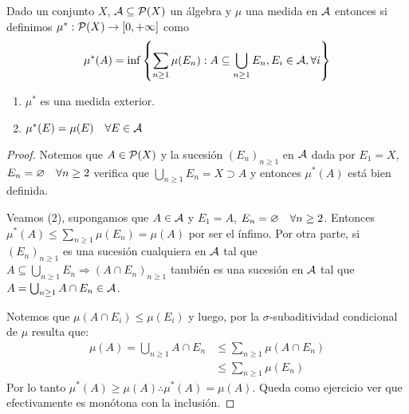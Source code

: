 \begin{theorem}
    Dado un conjunto $X$, $\mathcal{A} \subseteq \mathcal{P}(X)$ un álgebra y $\mu$ una medida en $\mathcal{A}$ entonces si definimos $\mu^*: \mathcal{P}(X) \to [0, +\infty]$ como \begin{align*}
        \mu^*(A) = \inf \left\{ \sum_{n \geq 1} \mu(E_n) : A \subseteq \bigcup_{n \geq 1} E_n, E_i \in \mathcal{A}, \forall i \right\}
    \end{align*}
    \begin{enumerate}
        \item $\mu^*$ es una medida exterior.
        \item $\mu^*(E) = \mu(E) \quad \forall E \in \mathcal{A}$
    \end{enumerate}

    \begin{proof}
        Notemos que $A \in \mathcal{P}(X)$ y la sucesión $(E_n)_{n \geq 1}$ en $\mathcal{A}$ dada por $E_1 = X$, $E_n = \varnothing \quad \forall n \geq 2$
        verifica que $\bigcup_{n \geq 1} E_n = X \supset A$ y entonces $\mu^*(A)$ está bien definida.

        Veamos (2), supongamos que $A \in \mathcal{A}$ y $E_1 = A$, $E_n = \varnothing \quad \forall n \geq 2$.
        Entonces $\mu^*(A) \leq \sum_{n \geq 1} \mu(E_n) = \mu(A)$ por ser el ínfimo. Por otra parte, si $(E_n)_{n \geq 1}$ es una sucesión
        cualquiera en $\mathcal{A}$ tal que $A \subseteq \bigcup_{n \geq 1} E_n \Rightarrow (A \cap E_n)_{n \geq 1}$ también es una sucesión en $\mathcal{A}$
        tal que $A = \bigcup_{n \geq 1} A \cap E_n \in \mathcal{A}$.

        Notemos que $\mu(A \cap E_i) \leq \mu(E_i)$ y luego, por la $\sigma$-subaditividad condicional de $\mu$ resulta que: \begin{align*}
            \mu(A) = \bigcup_{n \geq 1} A \cap E_n & \leq \sum_{n \geq 1} \mu(A \cap E_n) \\
                                                   & \leq \sum_{n \geq 1} \mu(E_n)
        \end{align*}
        Por lo tanto $\mu^*(A) \geq \mu(A) \therefore \mu^*(A) = \mu(A)$. Queda como ejercicio ver que efectivamente es monótona con la inclusión.


\end{proof}
\end{theorem}
